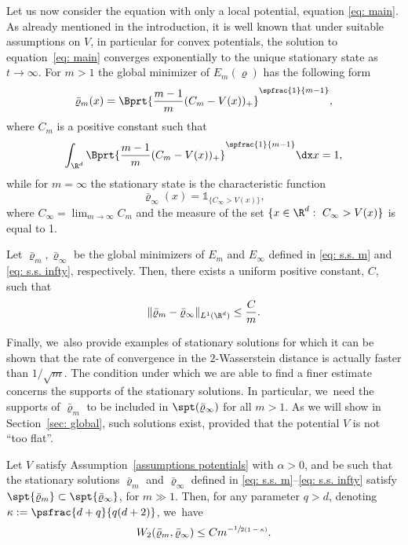 Let us now consider the equation with only a local potential, equation \eqref{eq: main}. As already mentioned in the introduction, it is well known that under suitable assumptions on $V$, in particular for convex potentials, the solution to equation~\eqref{eq: main} converges exponentially to the {unique} stationary state as $t\to\infty$. For $m>1$ the global minimizer of $E_m(\varrho)$ has the following form
\begin{equation}\label{eq: s.s. m}
\bar\varrho_m(x) = \Bprt{\frac{m-1}{m}(C_m - V(x))_+}^{\spfrac{1}{m-1}},
\end{equation}
where $C_m$ is a positive constant such that
\[
\int_{\R^d} \Bprt{\frac{m-1}{m}(C_m - V(x))_+}^{\spfrac{1}{m-1}} \dx x =1,
\]
while for $m=\infty$ the stationary state is the characteristic function
\begin{equation}\label{eq: s.s. infty}
\bar\varrho_\infty(x)=\mathds{1}_{\{C_\infty > V(x)\}},
\end{equation}
where $C_\infty=\lim_{m\to\infty}C_m$ and the measure of the set $\{x\in\R^d: \ C_\infty>V(x)\}$ is equal to 1.

\begin{theorem}\label{thm: L1 s.s.}
Let $\bar\varrho_m, \bar\varrho_\infty$ be the global minimizers of $E_m$ and $E_\infty$ defined in \eqref{eq: s.s. m} and \eqref{eq: s.s. infty}, respectively. Then, there exists a uniform positive constant, $C$, such that
\begin{equation*}
\|\bar\varrho_m- \bar\varrho_\infty\|_{L^1(\R^d)} \leq \frac{C}{{m}}.
\end{equation*}
\end{theorem}

Finally, we~also provide examples of stationary solutions for which it can be shown that the rate of convergence in the $2$-Wasserstein distance is actually faster than $1/\sqrt m$. The condition under which we are able to find a finer estimate concerns the supports of the stationary solutions. In particular, we~need the supports of $\bar\varrho_m$ to be included in $\spt (\bar\varrho_\infty)$ for all $m>1$. As we will show in Section~\ref{sec: global}, such solutions exist, provided that the potential $V$ is not ``too flat''.

\begin{theorem}\label{prop: s.s. improved}
Let $V$ satisfy Assumption~\ref{assumptions potentials} with $\alpha>0$, and be such that the stationary solutions $\bar\varrho_m$ and $\bar\varrho_\infty$ defined in \eqref{eq: s.s. m}--\eqref{eq: s.s. infty} satisfy $\spt{\bar\varrho_m}\subset \spt{\bar\varrho_\infty}$, for $m\gg 1$. Then, for any parameter $q>d$, denoting $\kappa := \psfrac{d+q}{q(d+2)}$, we~have
\begin{equation}\label{eq: improved}
W_2(\bar\varrho_m,\bar\varrho_\infty) \leq {C}{m^{-\sfrac{1}{2(1-\kappa)}}}.
\end{equation}
\end{theorem}


